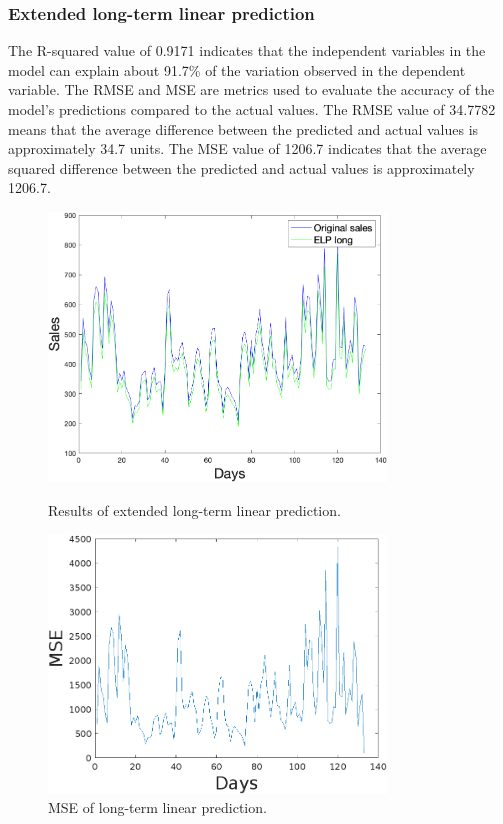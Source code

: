         \subsubsection{Extended long-term linear prediction} \label{subsec:res_eltlp}
        The R-squared value of 0.9171 indicates that the independent variables in the
        model can explain about 91.7\% of the variation observed in the dependent variable.
        The RMSE and MSE are metrics used to evaluate the accuracy of the model's predictions
        compared to the actual values. The RMSE value of 34.7782 means that the average difference
        between the predicted and actual values is approximately 34.7 units. The MSE value of
        1206.7 indicates that the average squared difference between the predicted and actual
        values is approximately 1206.7.\\
        \begin{figure}[h]
            \centering
            \begin{minipage}{0.49\textwidth}
                \centering
                \includegraphics[width=0.8\textwidth]{figures/expELTLP.png}
                \caption{Results of extended long-term linear prediction.}
                \label{fig:eltlpres}
            \end{minipage}\hfill
            \begin{minipage}{0.49\textwidth}
                \centering
                \includegraphics[width=0.8\textwidth]{figures/expMseELTLP.png}
                \caption{MSE of long-term linear prediction.}
                \label{fig:eltlpmse}
            \end{minipage}
        \end{figure}

